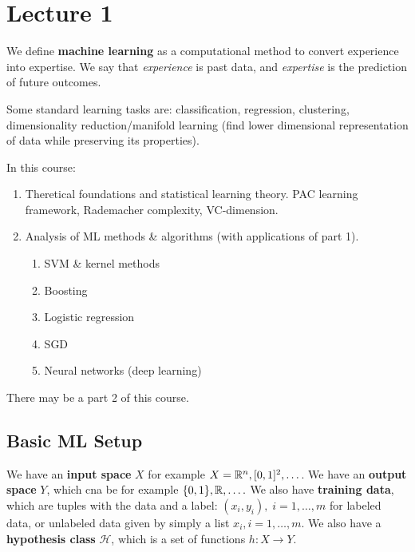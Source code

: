 \documentclass{article}
\begin{document}
\tableofcontents

\section{Lecture 1}
\label{sec:lecture1}

We define \textbf{machine learning} as a computational method to convert experience into expertise. We say that \textit{experience} is past data, and \textit{expertise} is the prediction of future outcomes.

Some standard learning tasks are: classification, regression, clustering, dimensionality reduction/manifold learning (find lower dimensional representation of data while preserving its properties).

In this course:
\begin{enumerate}
\item Theretical foundations and statistical learning theory. PAC learning framework, Rademacher complexity, VC-dimension.
\item Analysis of ML methods \& algorithms (with applications of part 1).
  \begin{enumerate}
  \item SVM \& kernel methods
  \item Boosting
  \item Logistic regression
  \item SGD
  \item Neural networks (deep learning)
  \end{enumerate}
\end{enumerate}

There may be a part 2 of this course.

\subsection{Basic ML Setup}
\label{sec:basic_ml_setup}

We have an \textbf{input space} $X$ for example $X = \mathbb{R}^n, [0, 1]^2, \dots$. We have an \textbf{output space} $Y$, which cna be for example $\{0, 1\}, \mathbb{R}, \dots.$ We also have \textbf{training data}, which are tuples with the data and a label: $(x_i, y_i) , \; i = 1, \dots, m$ for labeled data, or unlabeled data given by simply a list $x_i, i = 1, \dots, m$. We also have a \textbf{hypothesis class} $\mathcal{H}$, which is a set of functions $h : X \rightarrow Y$.
\end{document}
